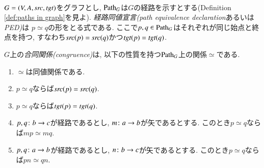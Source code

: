 \begin{definition}\label{def:congruence}\


$G=(V,A,\operatorname{\mathit{src}},\operatorname{\mathit{tgt}})$をグラフとし, $\Path_G$は$G$の経路を示すとする(Definition \ref{def:paths in graph}を見よ). \emph{経路同値宣言}\emph{(path equivalence declaration}あるいは\emph{PED)}は $p\simeq q$の形をとる式である. ここで$p,q\in\Path_G$はそれぞれが同じ始点と終点を持つ, すなわち$\operatorname{\mathit{src}}(p)=\operatorname{\mathit{src}}(q)$かつ$\operatorname{\mathit{tgt}}(p)=\operatorname{\mathit{tgt}}(q)$.


$G$上の\emph{合同関係(congruence)}は, 以下の性質を持つ$\Path_G$上の関係$\simeq$である.
\begin{enumerate}
\item $\simeq$は同値関係である.
\item $p\simeq q$ならば$\operatorname{\mathit{src}}(p)=\operatorname{\mathit{src}}(q)$.
\item $p\simeq q$ならば$\operatorname{\mathit{tgt}}(p)=\operatorname{\mathit{tgt}}(q)$.
\item $p,q\colon b\rightarrow c$が経路であるとし, $m\colon a\rightarrow b$が矢であるとする. このとき$p\simeq q$ならば$mp\simeq mq$. 
\item $p,q\colon a\rightarrow b$が経路であるとし, $n\colon b\rightarrow c$が矢であるとする. このとき$p\simeq q$ならば$pn\simeq qn$.
\end{enumerate}

\end{definition}

